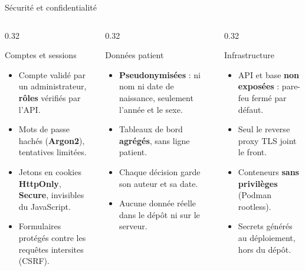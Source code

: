 \begin{frame}{Sécurité et confidentialité}
  \footnotesize
  \begin{columns}[T,onlytextwidth]
    \begin{column}{0.32\textwidth}
      \begin{block}{Comptes et sessions}
        \begin{itemize}
          \item Compte validé par un administrateur, \textbf{rôles} vérifiés
            par l'API.
          \item Mots de passe hachés (\textbf{Argon2}), tentatives limitées.
          \item Jetons en cookies \textbf{HttpOnly}, \textbf{Secure},
            invisibles du JavaScript.
          \item Formulaires protégés contre les requêtes intersites (CSRF).
        \end{itemize}
      \end{block}
    \end{column}
    \begin{column}{0.32\textwidth}
      \begin{exampleblock}{Données patient}
        \begin{itemize}
          \item \textbf{Pseudonymisées} : ni nom ni date de naissance, seulement
            l'année et le sexe.
          \item Tableaux de bord \textbf{agrégés}, sans ligne patient.
          \item Chaque décision garde son auteur et sa date.
          \item Aucune donnée réelle dans le dépôt ni sur le serveur.
        \end{itemize}
      \end{exampleblock}
    \end{column}
    \begin{column}{0.32\textwidth}
      \begin{alertblock}{Infrastructure}
        \begin{itemize}
          \item API et base \textbf{non exposées} : pare-feu fermé par défaut.
          \item Seul le reverse proxy TLS joint le front.
          \item Conteneurs \textbf{sans privilèges} (Podman rootless).
          \item Secrets générés au déploiement, hors du dépôt.
        \end{itemize}
      \end{alertblock}
    \end{column}
  \end{columns}
\end{frame}

